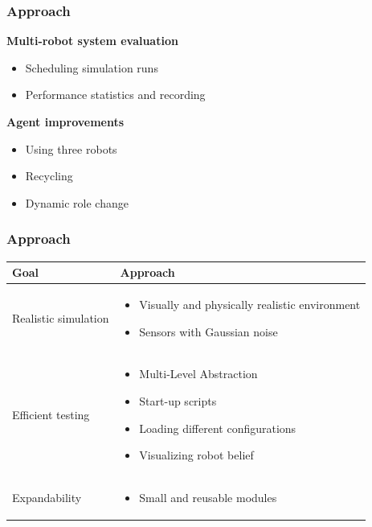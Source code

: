 \documentclass[]{beamer}
\begin{document}
\begin{frame}
  \frametitle{Approach}
  \large{\textbf{Multi-robot system evaluation}}
  \begin{itemize} 
  \item Scheduling simulation runs 
  \item Performance statistics and recording 
  \end{itemize} 
  \pause
  \large{\textbf{Agent improvements}}
  \begin{itemize} 
  \item Using three robots 
  \item Recycling 
  \item Dynamic role change 
  \end{itemize}
\end{frame}

\begin{frame}
  \frametitle{Approach}
  \begin{tabular}{p{3.7cm}|p{7.5cm}}
    \hline
    \large{\textbf{Goal}} & \large{\textbf{Approach}}\\
    \hline
    Realistic simulation & \begin{itemize} \item Visually and physically realistic environment \item Sensors with Gaussian noise \end{itemize} \pause \\ %
    \hline
    Efficient testing & \begin{itemize} \item Multi-Level Abstraction \item Start-up scripts \item Loading different configurations \item Visualizing robot belief \end{itemize} \pause \\ %
    \hline
    Expandability & \begin{itemize} \item Small and reusable modules \end{itemize} \\ %
    \hline
  \end{tabular}
\end{frame}
\end{document}
